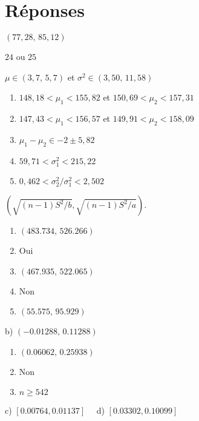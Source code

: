 \bigskip
\section*{Réponses}

\begin{reponse}{5.2}
    $(77,28, \, 85,12)$
  
\end{reponse}
\begin{reponse}{5.3}
    $24$ ou $25$
  
\end{reponse}
\begin{reponse}{5.4}
    $\mu \in (3,7, \, 5,7)$ et $\sigma^2 \in (3,50, \, 11,58)$
  
\end{reponse}
\begin{reponse}{5.5}
    \begin{enumerate}
    \item $148,18 < \mu_1 < 155,82$ et $150,69 < \mu_2 < 157,31$
    \item $147,43 < \mu_1 < 156,57$ et $149,91 < \mu_2 < 158,09$
    \item $\mu_1 - \mu_2 \in -2 \pm 5,82$
    \item $59,71 < \sigma_1^2 < 215,22$
    \item $0,462 < \sigma_2^2/\sigma_1^2 < 2,502$
    \end{enumerate}
  
\end{reponse}
\begin{reponse}{5.6}
    $(\sqrt{(n-1) S^2/b}, \sqrt{(n-1) S^2/a})$.
  
\end{reponse}
\begin{reponse}{5.7}
  
\end{reponse}
\begin{reponse}{5.9}
\begin{enumerate}
\item $(483.734, \, 526.266)$
\item Oui
\item $(467.935, \, 522.065)$
\item Non
\item $(55.575, \, 95.929)$
\end{enumerate}
\end{reponse}
\begin{reponse}{5.10}
b) $(-0.01288, \,0.11288)$
\end{reponse}
\begin{reponse}{5.11}
\begin{enumerate}
\item $(0.06062, \, 0.25938)$
\item Non
\item $n \geq 542$
\end{enumerate}
\end{reponse}
\begin{reponse}{5.12}
c) $[0.00764,0.01137]\quad$
d) $[0.03302,0.10099]$
\end{reponse}
